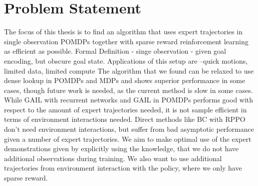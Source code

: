 \chapter{Problem Statement}
\label{chapter:Problem}
The focus of this thesis is to find an algorithm that uses expert trajectories in single observation POMDPs together with sparse reward reinforcement learning 
as efficient as possible. 
Formal Definition - singe observation - given goal encoding, but obscure goal state.
Applications of this setup are --quick motions, limited data, limited compute
The algorithm that we found can be relaxed to use dense lookup in POMDPs and MDPs and shows superior performance in some cases, though future work is needed, 
as the current method is slow in some cases.
While GAIL with recurrent networks and GAIL in POMDPs performs good with respect to the amount of expert trajectories needed, it is not sample efficient in terms of  
environment interactions needed. Direct methods like BC with RPPO don't need environment interactions, but suffer from bad asymptotic performance given a number of 
expert trajectories. We aim to make optimal use of the expert demonstrations given by explicitly using the knowledge, that we do not have additional observations 
during training. We also want to use additional trajectories from environment interaction with the policy, where we only have sparse reward. 